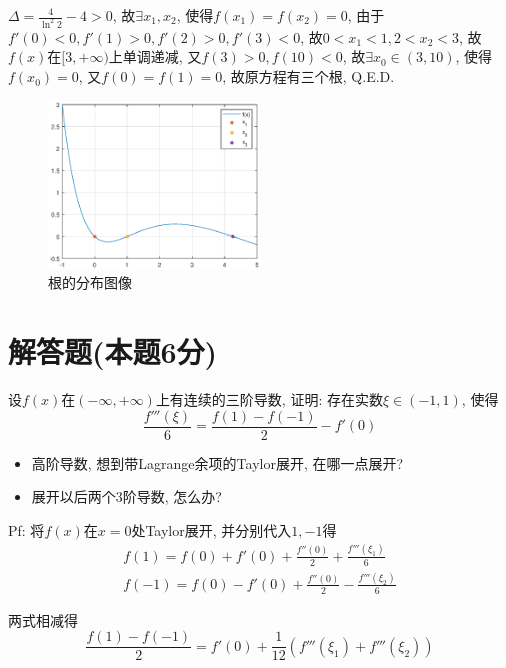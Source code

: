 \documentclass[10pt]{SelfArx} %
\numberwithin{dummy}{section}
\newenvironment{corollary}{\begin{cBox}\noindent{\bf\color{color1} 分析}}{\end{cBox}}
\begin{document}
$\Delta=\displaystyle\frac{4}{\ln^2 2}-4>0$, 故$\exists x_1,x_2$, 使得$f(x_1)=f(x_2)=0$, 由于$f'(0)<0, f'(1)>0, f'(2)>0, f'(3)<0$, 故$0<x_1<1, 2<x_2<3$, 故$f(x)$在$[3,+\infty)$上单调递减, 又$f(3)>0,f(10)<0$, 故$\exists x_0\in(3,10)$, 使得$f(x_0)=0$, 又$f(0)=f(1)=0$, 故原方程有三个根, Q.E.D.
\begin{figure}[h]
	\centering
	\includegraphics[width=0.5\textwidth]{1}
	\caption{根的分布图像}
\end{figure}


\section[解答题]{解答题(本题6分)}
设$f(x)$在$(-\infty,+\infty)$上有连续的三阶导数, 证明: 存在实数$\xi\in(-1,1)$, 使得
\begin{displaymath}
	\displaystyle\frac{f'''(\xi)}{6}=\displaystyle\frac{f(1)-f(-1)}{2}-f'(0)
\end{displaymath}
\begin{corollary}
	\begin{itemize}
		\item 高阶导数, 想到带Lagrange余项的Taylor展开, 在哪一点展开?
		\item 展开以后两个3阶导数, 怎么办?
	\end{itemize}
\end{corollary}
Pf: 将$f(x)$在$x=0$处Taylor展开, 并分别代入$1,-1$得
\begin{gather}
	f(1)=f(0)+f'(0)+\displaystyle\frac{f''(0)}{2}+\displaystyle\frac{f'''(\xi_1)}{6}\nonumber\\
	f(-1)=f(0)-f'(0)+\displaystyle\frac{f''(0)}{2}-\displaystyle\frac{f'''(\xi_2)}{6}\nonumber
\end{gather}

两式相减得
\begin{displaymath}
	\displaystyle\frac{f(1)-f(-1)}{2}=f'(0)+\displaystyle\frac{1}{12}(f'''(\xi_1)+f'''(\xi_2))
\end{displaymath}
\end{document}
